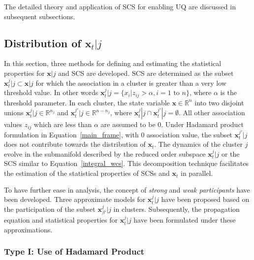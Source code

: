 The detailed theory and application of SCS for enabling UQ are discussed in subsequent subsections.


\subsection{Distribution of $\textbf{x}_t|j$}
\label{cluster_structure}

In this section, three methods for defining and estimating the statistical properties for $\textbf{x}|j$ and SCS are developed. SCS are determined as the subset $\textbf{x}_t^j|j \subset \textbf{x}|j$ for which the association in a cluster is greater than a very low threshold value. In other words $\textbf{x}_t^j|j = \lbrace x_i | z_{ij} > \alpha, i = 1 \text{ to } n \rbrace$, where $\alpha$ is the threshold parameter. In each cluster, the state variable $\textbf{x} \in \mathbb{R}^n$ into two disjoint unions $\textbf{x}_t^j|j \in \mathbb{R}^{n_j}$ and $\textbf{x}_t^{j'}|j \in \mathbb{R}^{n - n_j}$, where $\textbf{x}_t^{j}|j \cap \textbf{x}_t^{j'}|j = \emptyset $. All other association values $z_{ij}$ which are less than $\alpha$ are assumed to be 0. Under Hadamard product formulation in Equation~\ref{main_frame}, with 0 association value, the subset $\textbf{x}_t^{j'}|j$ does not contribute towards the distribution of $\textbf{x}_t$. The dynamics of the cluster $j$ evolve in the submanifold described by the reduced order subspace $\textbf{x}_t^{j}|j$ or the SCS similar to Equation~\ref{integral_wcs}. This decomposition technique facilitates the estimation of the statistical properties of SCSs and $\textbf{x}_t$ in parallel. 

 To have further ease in analysis, the concept of \textit{strong} and \textit{weak participants} have been developed. Three approximate models for $\textbf{x}_{t}^{j}|j$ have been proposed based on the participation of the subset $\textbf{x}_{\beta'}^{j}|j$ in clusters. Subsequently, the propagation equation and statistical properties for $\textbf{x}_{t}^{j}|j$ have been formulated under these approximations.
 
\subsubsection{Type I: Use of Hadamard Product}


